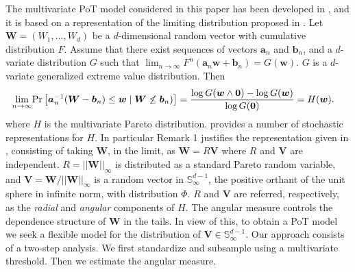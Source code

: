 The multivariate PoT model considered in this paper has been developed in 
    \cite{trubey:pg}, and it is based on a representation of the limiting 
    distribution proposed in \cite{RoSeWa2018a}.  Let 
    $\bm{W} = (W_1, \ldots ,W_d)$ be a $d$-dimensional random vector with
    cumulative distribution $F$. Assume 
    that there exist sequences of vectors $\bm{a}_n$ and $\bm{b}_n$,
    and a $d$-variate distribution $G$ such that 
    $\lim_{n\rightarrow\infty} F^n(\bm{a}_n \bm{w} + \bm{b}_n) = 
    G(\bm{w})$. $G$ is a $d$-variate generalized extreme value 
    distribution. Then
    \begin{equation*}
        \begin{aligned}
            \lim\limits_{n\rightarrow\infty} 
                &\text{Pr}\left[\bm{a}^{-1}_n (\bm{W} - \bm{b}_n) 
                \leq \bm{w} \mid \bm{W} \not\leq \bm{b}_n)\right]  
                = \frac{\log G(\bm{w} \wedge \bm{0}) 
                - \log G(\bm{w}) }{\log G(\bm{0})} = H(\bm{w}).
        \end{aligned}
    \end{equation*}
    where $H$ is the multivariate Pareto distribution. \cite{RoSeWa2018a}
    provides a number of stochastic representations for $H$. In particular
    Remark 1 justifies the representation given in \cite{ferreira2014},
    consisting of taking $\bm{W}$, in the limit, as $\bm{W} = R\bm{V}$ 
    where $R$ and $\bm{V}$ are independent. $R = ||\bm{W}||_\infty$ is 
    distributed as a standard Pareto  random variable, and
    $\bm{V} = \bm{W}/||\bm{W}||_\infty$ is a random vector in  
    $\mathbb{S}_{\infty}^{d-1}$, the positive orthant of the 
    unit  sphere in infinite norm, with distribution $\Phi$. 
    $R$ and $\bm{V}$ are referred, respectively, as the {\em radial} 
    and {\em angular}  components of $H$. The angular measure controls 
    the dependence  structure of $\bm{W}$  in the tails. In view of 
    this, to obtain a  PoT model we seek a flexible model for the 
    distribution of $\bm{V} \in {\mathbb S}_{\infty}^{d-1}$. Our approach
    consists of a two-step analysis. We first standardize and subsample using
    a multivariate threshold. Then we estimate the angular measure.

